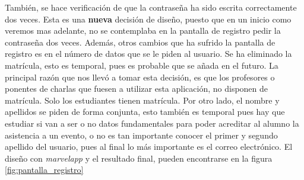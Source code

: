 También, se hace verificación de que la contraseña ha sido escrita correctamente dos veces. Esta es una \textbf{nueva} decisión de diseño, puesto que en un inicio como veremos mas adelante, no se contemplaba en la pantalla de registro pedir la contraseña dos veces. Además, otros cambios que ha sufrido la pantalla de registro es en el número de datos que se le piden al usuario. Se ha eliminado la matrícula, esto es temporal, pues es probable que se añada en el futuro. La principal razón que nos llevó a tomar esta decisión, es que los profesores o ponentes de charlas que fuesen a utilizar esta aplicación, no disponen de matrícula. Solo los estudiantes tienen matrícula. Por otro lado, el nombre y apellidos se piden de forma conjunta, esto también es temporal pues hay que estudiar si van a ser o no datos fundamentales para poder acreditar al alumno la asistencia a un evento, o no es tan importante conocer el primer y segundo apellido del usuario, pues al final lo más importante es el correo electrónico. El diseño con \emph{marvelapp} y el resultado final, pueden encontrarse en la figura \ref{fig:pantalla_registro}

